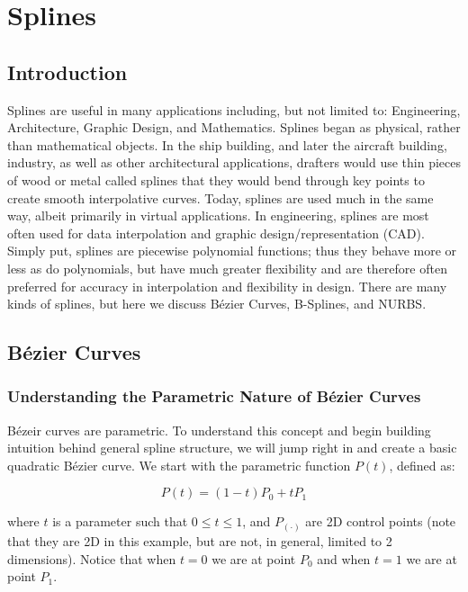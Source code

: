 
\usepackage{amsthm,amssymb}

	
\chapter*{Splines}
\label{ch:splines}


\section{Introduction}
\label{sec:splinesintro}

Splines are useful in many applications including, but not limited to: Engineering, Architecture, Graphic Design, and Mathematics. Splines began as physical, rather than mathematical objects. In the ship building, and later the aircraft building, industry, as well as other architectural applications, drafters would use thin pieces of wood or metal called splines that they would bend through key points to create smooth interpolative curves.  Today, splines are used much in the same way, albeit primarily in virtual applications.  In engineering, splines are most often used for data interpolation and graphic design/representation (CAD). Simply put, splines are piecewise polynomial functions; thus they behave more or less as do polynomials, but have much greater flexibility and are therefore often preferred for accuracy in interpolation and flexibility in design. There are many kinds of splines, but here we discuss Bézier Curves, B-Splines, and NURBS.

\section{Bézier Curves}
\subsection{Understanding the Parametric Nature of Bézier Curves}
Bézeir curves are parametric.  To understand this concept and begin building intuition behind general spline structure, we will jump right in and create a basic quadratic Bézier curve. We start with the parametric function $P(t)$, defined as:

\begin{equation}
\label{eq:parametricrelation}
P(t) = (1-t)P_0 + tP_1
\end{equation}

where $t$ is a parameter such that $0 \leq t \leq 1$, and $P_{(\cdot)}$ are 2D control points (note that they are 2D in this example, but are not, in general, limited to 2 dimensions). Notice that when $t=0$ we are at point $P_0$ and when $t=1$ we are at point $P_1$. 

